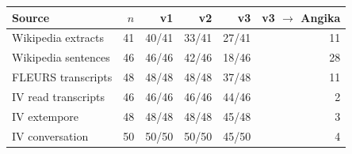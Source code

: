 \begin{tabular}{lrrrrr}
\toprule
Source & $n$ & v1 & v2 & v3 & v3 $\to$ Angika \\
\midrule
Wikipedia extracts & 41 & 40/41 & 33/41 & 27/41 & 11 \\
Wikipedia sentences & 46 & 46/46 & 42/46 & 18/46 & 28 \\
FLEURS transcripts & 48 & 48/48 & 48/48 & 37/48 & 11 \\
IV read transcripts & 46 & 46/46 & 46/46 & 44/46 & 2 \\
IV extempore & 48 & 48/48 & 48/48 & 45/48 & 3 \\
IV conversation & 50 & 50/50 & 50/50 & 45/50 & 4 \\
\bottomrule
\end{tabular}
